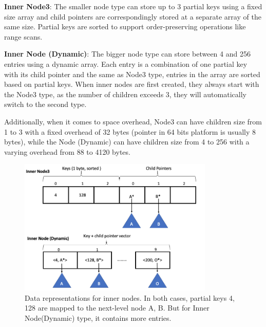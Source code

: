 \documentclass[sigplan,screen,nonacm]{acmart}
\begin{document}
\textbf {Inner Node3}: The smaller node type can store up to 3 partial keys using a fixed size array and child pointers are correspondingly stored at a separate array of the same size. Partial keys are sorted to support order-preserving operations like range scans. 

\textbf {Inner Node (Dynamic)}: The bigger node type can store between 4 and 256 entries using a dynamic array. Each entry is a combination of one partial key with its child pointer and the same as Node3 type, entries in the array are sorted based on partial keys. When inner nodes are first created, they always start with the Node3 type, as the number of children exceeds 3, they will automatically switch to the second type.  

Additionally, when it comes to space overhead, Node3 can have children size from 1 to 3 with a fixed overhead of 32 bytes (pointer in 64 bits platform is usually 8 bytes), while the Node (Dynamic) can have children size from 4 to 256 with a varying overhead from 88 to 4120 bytes. 
\begin{figure}[t]
  \centering
  \includegraphics[width=\linewidth, height=6.5cm]{pic/inner nodes.png}
  \setlength{\belowcaptionskip}{-7pt} 
  \caption{Data representations for inner nodes. In both cases, partial keys 4, 128 are mapped to the next-level node A, B. But for Inner Node(Dynamic) type, it contains more entries.}
  \label{fig:inner-nodes}
\end{figure}
\end{document}
